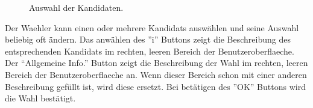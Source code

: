 \documentclass[parskip=full,11pt,twoside]{scrartcl}
\begin{document}
\begin{figure}[H]
	\caption{\label{fig:whlr-wahl}
		Auswahl der Kandidaten.
	}
\end{figure}
Der \gls{Waehler} kann einen oder mehrere \glspl{Kandidat} auswählen und seine Auswahl beliebig oft ändern.
Das anwählen des ''i'' Buttons zeigt die Beschreibung des entsprechenden \glspl{Kandidat} im rechten, leeren Bereich der \gls{Benutzeroberflaeche}.
Der \enquote{Allgemeine Info.} Button zeigt die Beschreibung der \gls{Wahl} im rechten, leeren Bereich der \gls{Benutzeroberflaeche} an. Wenn dieser Bereich schon mit einer anderen Beschreibung gefüllt ist, wird diese ersetzt.
Bei betätigen des ''OK'' Buttons wird die \gls{Wahl} bestätigt.
\end{document}
